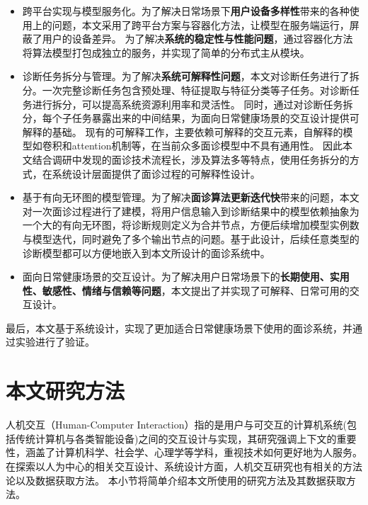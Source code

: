 \begin{itemize}

    \item 跨平台实现与模型服务化。为了解决日常场景下\textbf{用户设备多样性}带来的各种使用上的问题，本文采用了跨平台方案与容器化方法，让模型在服务端运行，屏蔽了用户的设备差异。
    为了解决\textbf{系统的稳定性与性能问题}，通过容器化方法将算法模型打包成独立的服务，并实现了简单的分布式主从模块。

    \item 诊断任务拆分与管理。为了解决\textbf{系统可解释性问题}，本文对诊断任务进行了拆分。一次完整诊断任务包含预处理、特征提取与特征分类等子任务。对诊断任务进行拆分，可以提高系统资源利用率和灵活性。
    同时，通过对诊断任务拆分，每个子任务暴露出来的中间结果，为面向日常健康场景的交互设计提供可解释的基础。
    现有的可解释工作，主要依赖可解释的交互元素，自解释的模型如卷积和attention机制等\cite{abdul2018trends}，在当前众多面诊模型中不具有通用性。
    因此本文结合调研中发现的面诊技术流程长，涉及算法多等特点，使用任务拆分的方式，在系统设计层面提供了面诊过程的可解释性设计。
    
    \item 基于有向无环图的模型管理。为了解决\textbf{面诊算法更新迭代快}带来的问题，本文对一次面诊过程进行了建模，将用户信息输入到诊断结果中的模型依赖抽象为一个大的有向无环图，将诊断规则定义为合并节点，方便后续增加模型实例数与模型迭代，同时避免了多个输出节点的问题。基于此设计，后续任意类型的诊断模型都可以方便地嵌入到本文所设计的面诊系统中。
    
    \item 面向日常健康场景的交互设计。为了解决用户日常场景下的\textbf{长期使用、实用性、敏感性、情绪与信赖等问题}，本文提出了并实现了可解释、日常可用的交互设计。

\end{itemize}

最后，本文基于系统设计，实现了更加适合日常健康场景下使用的面诊系统，并通过实验进行了验证。

\section{本文研究方法}

人机交互（Human-Computer Interaction）指的是用户与可交互的计算机系统(包括传统计算机与各类智能设备)之间的交互设计与实现，其研究强调上下文的重要性，涵盖了计算机科学、社会学、心理学等学科，重视技术如何更好地为人服务\cite{lazar2017research}。
在探索以人为中心的相关交互设计、系统设计方面，人机交互研究也有相关的方法论以及数据获取方法\cite{lazar2017research}。
本小节将简单介绍本文所使用的研究方法及其数据获取方法。

